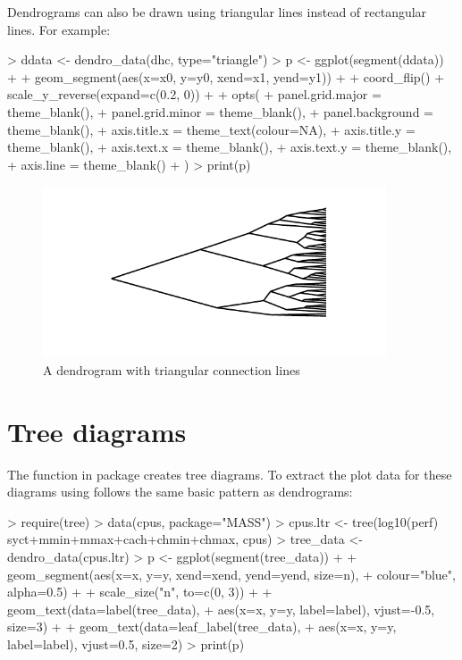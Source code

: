 \documentclass[10pt,oneside]{article}
\begin{document}
Dendrograms can also be drawn using triangular lines instead of rectangular lines.  For example:

\begin{Schunk}
\begin{Sinput}
> ddata <- dendro_data(dhc, type="triangle")
> p <- ggplot(segment(ddata)) + 
+     geom_segment(aes(x=x0, y=y0, xend=x1, yend=y1)) + 
+     coord_flip() + scale_y_reverse(expand=c(0.2, 0)) +
+     opts(
+         panel.grid.major = theme_blank(),
+         panel.grid.minor = theme_blank(),
+         panel.background = theme_blank(),
+         axis.title.x = theme_text(colour=NA),
+         axis.title.y = theme_blank(),
+         axis.text.x = theme_blank(),
+         axis.text.y = theme_blank(),
+         axis.line = theme_blank()
+     )  
> print(p)
\end{Sinput}
\end{Schunk}

\begin{figure}[h]
\begin{center}
\includegraphics[width=4in, height=2in]{ggdendro-dendro3}
\end{center}
\caption{A dendrogram with triangular connection lines}
\end{figure}

  

\section{Tree diagrams}

The  function in package  creates tree diagrams.  To extract the plot data for these diagrams using \ggdendro{} follows the same basic pattern as dendrograms: 

\begin{Schunk}
\begin{Sinput}
> require(tree)
> data(cpus, package="MASS")
> cpus.ltr <- tree(log10(perf) ~ syct+mmin+mmax+cach+chmin+chmax, cpus)
> tree_data <- dendro_data(cpus.ltr)
> p <- ggplot(segment(tree_data)) +
+     geom_segment(aes(x=x, y=y, xend=xend, yend=yend, size=n), 
+         colour="blue", alpha=0.5) +
+     scale_size("n", to=c(0, 3)) +
+     geom_text(data=label(tree_data), 
+         aes(x=x, y=y, label=label), vjust=-0.5, size=3) +
+     geom_text(data=leaf_label(tree_data), 
+         aes(x=x, y=y, label=label), vjust=0.5, size=2)
> print(p)
\end{Sinput}
\end{Schunk}
\end{document}
